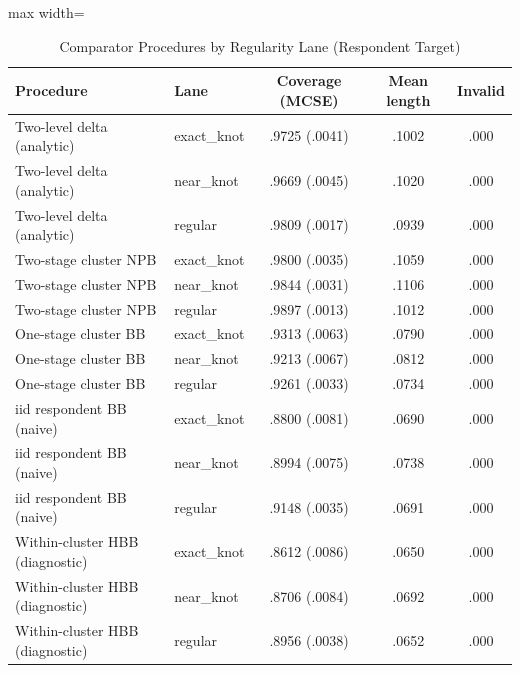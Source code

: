 \begin{table}[H]
\caption{Comparator Procedures by Regularity Lane (Respondent Target)}
\label{tab:comparatorsF2}
\centering
\small
\begin{adjustbox}{max width=\textwidth}
\begin{tabular}{llccc}
\toprule
Procedure & Lane & Coverage (MCSE) & Mean length & Invalid \\
\midrule
Two-level delta (analytic) & exact\_knot & .9725 (.0041) & .1002 & .000 \\
Two-level delta (analytic) & near\_knot & .9669 (.0045) & .1020 & .000 \\
Two-level delta (analytic) & regular & .9809 (.0017) & .0939 & .000 \\
Two-stage cluster NPB & exact\_knot & .9800 (.0035) & .1059 & .000 \\
Two-stage cluster NPB & near\_knot & .9844 (.0031) & .1106 & .000 \\
Two-stage cluster NPB & regular & .9897 (.0013) & .1012 & .000 \\
One-stage cluster BB & exact\_knot & .9313 (.0063) & .0790 & .000 \\
One-stage cluster BB & near\_knot & .9213 (.0067) & .0812 & .000 \\
One-stage cluster BB & regular & .9261 (.0033) & .0734 & .000 \\
iid respondent BB (naive) & exact\_knot & .8800 (.0081) & .0690 & .000 \\
iid respondent BB (naive) & near\_knot & .8994 (.0075) & .0738 & .000 \\
iid respondent BB (naive) & regular & .9148 (.0035) & .0691 & .000 \\
Within-cluster HBB (diagnostic) & exact\_knot & .8612 (.0086) & .0650 & .000 \\
Within-cluster HBB (diagnostic) & near\_knot & .8706 (.0084) & .0692 & .000 \\
Within-cluster HBB (diagnostic) & regular & .8956 (.0038) & .0652 & .000 \\
\bottomrule
\end{tabular}
\end{adjustbox}
\end{table}
